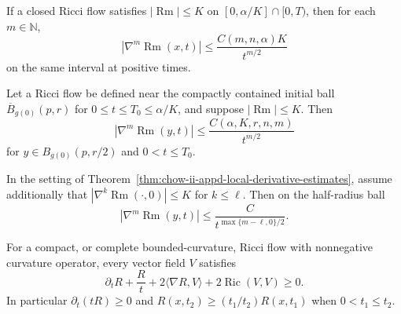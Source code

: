 \begin{theorem}
\label{thm:chow-ii-appd-global-derivative-estimates}
If a closed Ricci flow satisfies $|\operatorname{Rm}|\leq K$ on
$[0,\alpha/K]\cap[0,T)$, then for each $m\in\mathbb N$,
\[
 |\nabla^m\operatorname{Rm}(x,t)|\leq
 \frac{C(m,n,\alpha)K}{t^{m/2}}
\]
on the same interval at positive times.
\end{theorem}

\begin{theorem}
\label{thm:chow-ii-appd-local-derivative-estimates}
Let a Ricci flow be defined near the compactly contained initial ball
$\overline B_{g(0)}(p,r)$ for $0\leq t\leq T_0\leq\alpha/K$, and suppose
$|\operatorname{Rm}|\leq K$. Then
\[
 |\nabla^m\operatorname{Rm}(y,t)|\leq
 \frac{C(\alpha,K,r,n,m)}{t^{m/2}}
\]
for $y\in B_{g(0)}(p,r/2)$ and $0<t\leq T_0$.
\end{theorem}

\begin{theorem}
\label{thm:chow-ii-appd-modified-global-derivative-estimates}
In the setting of Theorem~\ref{thm:chow-ii-appd-local-derivative-estimates},
assume additionally that $|\nabla^k\operatorname{Rm}(\cdot,0)|\leq K$ for
$k\leq\ell$. Then on the half-radius ball
\[
 |\nabla^m\operatorname{Rm}(y,t)|\leq
 \frac C{t^{\max\{m-\ell,0\}/2}}.
\]
\end{theorem}

\begin{theorem}
\label{thm:chow-ii-appd-trace-harnack}
For a compact, or complete bounded-curvature, Ricci flow with nonnegative
curvature operator, every vector field $V$ satisfies
\[
 \partial_tR+\frac Rt+2\langle\nabla R,V\rangle
 +2\operatorname{Ric}(V,V)\geq0.
\]
In particular $\partial_t(tR)\geq0$ and
$R(x,t_2)\geq(t_1/t_2)R(x,t_1)$ when $0<t_1\leq t_2$.
\end{theorem}

